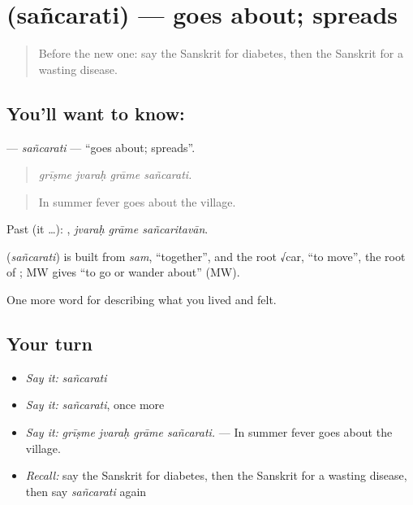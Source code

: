 \section[\texorpdfstring{\sk{सञ्चरति} (sañcarati)}{सञ्चरति (sañcarati)}]{ (sañcarati) — goes about; spreads}

\label{lesson:SA-C479-sancarati}



\begin{quote}
Before the new one: say the Sanskrit for diabetes, then the Sanskrit for a wasting disease.
\end{quote}

\subsection*{You'll want to know: }
\textbf{} — \emph{sañcarati} — \textquotedblleft{}goes about; spreads\textquotedblright{}.

\begin{quote}
   
\end{quote}

\begin{quote}
\emph{grīṣme jvaraḥ grāme sañcarati.}
\end{quote}

\begin{quote}
In summer fever goes about the village.
\end{quote}

Past (it …):   , \emph{jvaraḥ grāme sañcaritavān}.

\begin{cousinweb}
\textbf{} (\emph{sañcarati}) is built from \emph{sam}, \textquotedblleft{}together\textquotedblright{}, and the root √car, \textquotedblleft{}to move\textquotedblright{}, the root of \textbf{}; MW gives \textquotedblleft{}to go or wander about\textquotedblright{} (MW).
\end{cousinweb}

\begin{grammarlens}[title={What you've built}]
One more word for describing what you lived and felt.
\end{grammarlens}

\subsection*{Your turn}
\begin{itemize}
\raggedright
  \item \emph{Say it:} \emph{sañcarati}
  \item \emph{Say it:} \emph{sañcarati}, once more
  \item \emph{Say it:} \emph{grīṣme jvaraḥ grāme sañcarati.} — In summer fever goes about the village.
  \item \emph{Recall:} say the Sanskrit for diabetes, then the Sanskrit for a wasting disease, then say \emph{sañcarati} again
\end{itemize}

